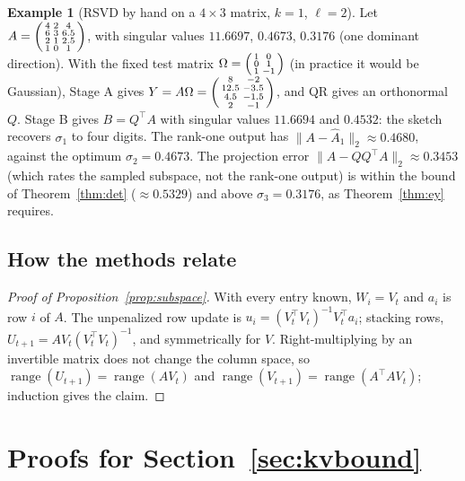 \documentclass[10pt]{article}
\theoremstyle{plain}
\theoremstyle{definition}
\newtheorem{example}[theorem]{Example}
\theoremstyle{remark}
\newcommand{\T}{^{\top}}
\newcommand{\opn}[1]{\lVert #1\rVert_2}
\DeclareMathOperator{\range}{range}
\begin{document}
\begin{example}[RSVD by hand on a $4\times3$ matrix, $k=1$, $\ell=2$]\label{ex:rsvd}
Let $A=\begin{psmallmatrix}4&2&4\\6&3&6.5\\2&1&2.5\\1&0&1\end{psmallmatrix}$, with singular values $11.6697$, $0.4673$, $0.3176$ (one dominant direction). With the fixed test matrix $\Omega=\begin{psmallmatrix}1&0\\0&1\\1&-1\end{psmallmatrix}$ (in practice it would be Gaussian), Stage A gives $Y=A\Omega=\begin{psmallmatrix}8&-2\\12.5&-3.5\\4.5&-1.5\\2&-1\end{psmallmatrix}$, and QR gives an orthonormal $Q$. Stage B gives $B=Q\T A$ with singular values $11.6694$ and $0.4532$: the sketch recovers $\sigma_1$ to four digits. The rank-one output has $\opn{A-\hat A_1}\approx0.4680$, against the optimum $\sigma_2=0.4673$. The projection error $\opn{A-QQ\T A}\approx0.3453$ (which rates the sampled subspace, not the rank-one output) is within the bound of Theorem~\ref{thm:det} ($\approx0.5329$) and above $\sigma_3=0.3176$, as Theorem~\ref{thm:ey} requires.
\end{example}

\subsection{How the methods relate}

\begin{proof}[Proof of Proposition~\ref{prop:subspace}]
With every entry known, $W_i=V_t$ and $a_i$ is row $i$ of $A$. The unpenalized row update is $u_i=(V_t\T V_t)^{-1}V_t\T a_i$; stacking rows, $U_{t+1}=AV_t(V_t\T V_t)^{-1}$, and symmetrically for $V$. Right-multiplying by an invertible matrix does not change the column space, so $\range(U_{t+1})=\range(AV_t)$ and $\range(V_{t+1})=\range(A\T AV_t)$; induction gives the claim.
\end{proof}

\section{Proofs for Section~\ref{sec:kvbound}}
\label{app:boundproofs}
\end{document}
